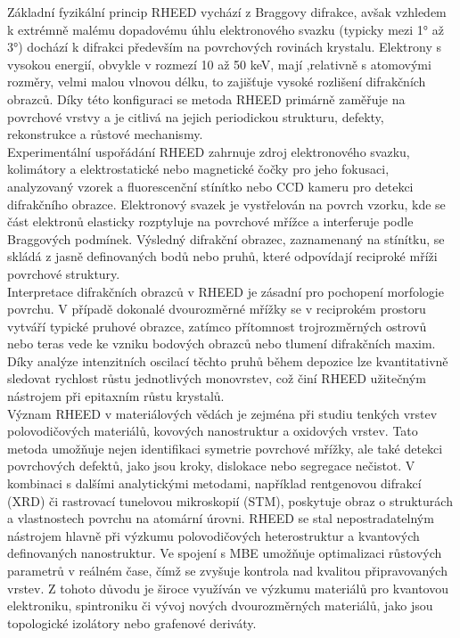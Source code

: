 \documentclass{article}
\begin{document}
Základní fyzikální princip RHEED vychází z Braggovy difrakce, avšak vzhledem k extrémně malému dopadovému úhlu elektronového svazku (typicky mezi 1° až 3°) dochází k difrakci především na povrchových rovinách krystalu. Elektrony s vysokou energií, obvykle v rozmezí 10 až 50 keV, mají ,relativně s atomovými rozměry, velmi malou vlnovou délku, to zajišťuje vysoké rozlišení difrakčních obrazců. Díky této konfiguraci se metoda RHEED primárně zaměřuje na povrchové vrstvy a je citlivá na jejich periodickou strukturu, defekty, rekonstrukce a růstové mechanismy.\\

Experimentální uspořádání RHEED zahrnuje zdroj elektronového svazku, kolimátory a elektrostatické nebo magnetické čočky pro jeho fokusaci, analyzovaný vzorek a fluorescenční stínítko nebo CCD kameru pro detekci difrakčního obrazce. Elektronový svazek je vystřelován na povrch vzorku, kde se část elektronů elasticky rozptyluje na povrchové mřížce a interferuje podle Braggových podmínek. Výsledný difrakční obrazec, zaznamenaný na stínítku, se skládá z jasně definovaných bodů nebo pruhů, které odpovídají reciproké mříži povrchové struktury.\\

Interpretace difrakčních obrazců v RHEED je zásadní pro pochopení morfologie povrchu. V případě dokonalé dvourozměrné mřížky se v reciprokém prostoru vytváří typické pruhové obrazce, zatímco přítomnost trojrozměrných ostrovů nebo teras vede ke vzniku bodových obrazců nebo tlumení difrakčních maxim. Díky analýze intenzitních oscilací těchto pruhů během depozice lze kvantitativně sledovat rychlost růstu jednotlivých monovrstev, což činí RHEED užitečným nástrojem při epitaxním růstu krystalů.\\

Význam RHEED v materiálových vědách je zejména při studiu tenkých vrstev polovodičových materiálů, kovových nanostruktur a oxidových vrstev. Tato metoda umožňuje nejen identifikaci symetrie povrchové mřížky, ale také detekci povrchových defektů, jako jsou kroky, dislokace nebo segregace nečistot. V kombinaci s dalšími analytickými metodami, například rentgenovou difrakcí (XRD) či rastrovací tunelovou mikroskopií (STM), poskytuje obraz o strukturách a vlastnostech povrchu na atomární úrovni. RHEED se stal nepostradatelným nástrojem hlavně při výzkumu polovodičových heterostruktur a kvantových definovaných nanostruktur. Ve spojení s MBE umožňuje optimalizaci růstových parametrů v reálném čase, čímž se zvyšuje kontrola nad kvalitou připravovaných vrstev. Z tohoto důvodu je široce využíván ve výzkumu materiálů pro kvantovou elektroniku, spintroniku či vývoj nových dvourozměrných materiálů, jako jsou topologické izolátory nebo grafenové deriváty.\\
\end{document}
